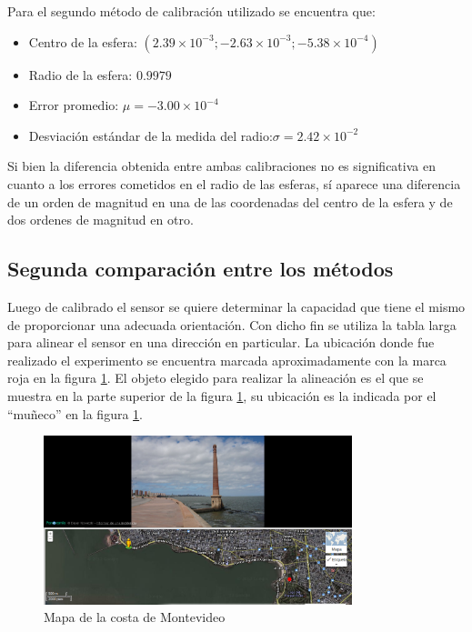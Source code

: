 \documentclass[spanish,12pt,a4paper,titlepage]{report}
\begin{document}
Para el segundo método de calibración utilizado se encuentra que:
\begin{itemize}
\item Centro de la esfera: $(2.39\times10^{-3};-2.63\times10^{-3};-5.38\times10^{-4})$
\item Radio de la esfera: $0.9979$
\item Error promedio: $\mu =-3.00\times 10^{-4}$
\item Desviación estándar de la medida del radio:$\sigma = 2.42\times 10^{-2}$
\end{itemize}


Si bien la diferencia obtenida entre ambas calibraciones no es significativa en cuanto a los errores cometidos en el radio de las esferas, sí aparece una diferencia de un orden de magnitud en una de las coordenadas del centro de la esfera y de dos ordenes de magnitud en otro. 


\subsection{Segunda comparación entre los métodos}
Luego de calibrado el sensor se quiere determinar la capacidad que tiene el mismo de proporcionar una adecuada orientación. Con dicho fin se utiliza la tabla larga para alinear el sensor en una dirección en particular. La ubicación donde fue realizado el experimento se encuentra marcada aproximadamente con la marca roja en la figura \ref{fig:mapa}. El objeto elegido para realizar la alineación es el que se muestra en la parte superior de la figura \ref{fig:mapa}, su ubicación es la indicada por el ``muñeco'' en la figura \ref{fig:mapa}.
\begin{figure}
  \begin{center}
	\includegraphics[width=0.8\textwidth]
		{./pics/mapa.png}
	
  \end{center}
  \caption{Mapa de la costa de Montevideo}
  \label{fig:mapa}
\end{figure}
\end{document}
